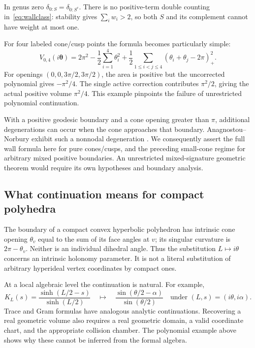\documentclass[11pt,a4paper]{article}
\numberwithin{equation}{section}
\theoremstyle{definition}
\theoremstyle{remark}
\newcommand{\angles}{\boldsymbol\theta}
\begin{document}
In genus zero $\delta_{0:S}=\delta_{0:S^c}$. There is no positive-term
double counting in~\eqref{eq:wallclass}: stability gives $\sum_iw_i>2$,
so both $S$ and its complement cannot have weight at most one.

For four labeled cone/cusp points the formula becomes particularly simple:
\begin{equation}
 \boxed{
 V_{0,4}(i\angles)=2\pi^2-\frac12\sum_{i=1}^4\theta_i^2
 +\frac12\sum_{1\le i<j\le4}(\theta_i+\theta_j-2\pi)_+^2.}
 \label{eq:conev04}
\end{equation}
For openings $(0,0,3\pi/2,3\pi/2)$, the area is positive but the uncorrected
polynomial gives $-\pi^2/4$. The single active correction contributes
$\pi^2/2$, giving the actual positive volume $\pi^2/4$. This example
pinpoints the failure of unrestricted polynomial continuation.

With a positive geodesic boundary and a cone opening greater than $\pi$,
additional degenerations can occur when the cone approaches that boundary.
Anagnostou--Norbury exhibit such a nonnodal degeneration
\cite[Lemma 2.10]{AnagnostouNorbury}. We consequently assert the full
wall formula here for pure cones/cusps, and the preceding small-cone regime
for arbitrary mixed positive boundaries. An unrestricted mixed-signature
geometric theorem would require its own hypotheses and boundary analysis.

\subsection{What continuation means for compact polyhedra}

The boundary of a compact convex hyperbolic polyhedron has intrinsic cone
opening $\theta_v$ equal to the sum of its face angles at $v$; its singular
curvature is $2\pi-\theta_v$. Neither is an individual dihedral angle.
Thus the substitution $L\mapsto i\theta$ concerns an intrinsic holonomy
parameter. It is not a literal substitution of arbitrary hyperideal vertex
coordinates by compact ones.

At a local algebraic level the continuation is natural. For example,
\begin{equation}
 K_L(s)=\frac{\sinh(L/2-s)}{\sinh(L/2)}
 \quad\longmapsto\quad
 \frac{\sin(\theta/2-\alpha)}{\sin(\theta/2)}
 \quad\text{under }(L,s)=(i\theta,i\alpha).
 \label{eq:kernelcontinuation}
\end{equation}
Trace and Gram formulas have analogous analytic continuations. Recovering
a real geometric volume also requires a real geometric domain, a valid
coordinate chart, and the appropriate collision chamber. The polynomial
example above shows why these cannot be inferred from the formal algebra.
\end{document}
